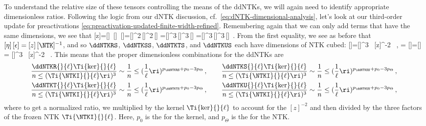 To understand the relative size of these tensors controlling the means of the ddNTKs, we will again need to identify  appropriate dimensionless ratios. Following the  logic from our dNTK discussion, cf.~\eqref{eq:dNTK-dimensional-analysis}, let's look at our third-order update for preactivations \eqref{eq:preactivation-updated-finite-width-refined}. Remembering again that we can only add terms that have the same dimensions, we see that
\be\label{eq:ddNTK-dimensional-analysis}
[z]=[\eta]\, [\epsilon] \,[\NTK]=[\eta]^2\,[\epsilon]^2\,[\dNTK] =[\eta]^3\,[\epsilon]^3\,[\ddNTK] =[\eta]^3\,[\epsilon]^3\,[\ddNTKII] \,.
\ee 
From the first equality, we see as before that $[\eta]\,[\epsilon]=[z]\,[\NTK]^{-1}$, and so $\ddNTKRS$, $\ddNTKSS$, $\ddNTKTS$, and $\ddNTKUS$ each have dimensions of NTK cubed:
\be\label{eq:dimensions-of-ddNTK-stuff}
[\ddNTKRS]\equiv [\ddNTK]=[\NTK]^{3} \, [z]^{-2} \, , \qquad [\ddNTKSS] = [\ddNTKTS]=[\ddNTKUS] \equiv [\ddNTKII]= [\NTK]^{3} \, [z]^{-2} \, .
\ee
This means that the proper dimensionless combinations for the ddNTKs are
\begin{align}\label{eq:scaling-relations-ddNTKs}
\frac{\ddNTKR{}{\ell} \Ti{\ker}{}{\ell}}{n \le( \Ti{\NTKI}{}{\ell} \ri)^3 } \sim \frac{1}{n}\le( \frac{1}{\ell} \ri)^{p_\ddNTKRS +p_0 - 3p_\Theta} \,, \qquad \frac{\ddNTKS{}{\ell}\Ti{\ker}{}{\ell}}{n \le( \Ti{\NTKI}{}{\ell} \ri)^3} \sim \frac{1}{n}\le( \frac{1}{\ell} \ri)^{p_\ddNTKSS+p_0  - 3p_\Theta}\, , \\
\frac{\ddNTKT{}{\ell} \Ti{\ker}{}{\ell}}{n \le( \Ti{\NTKI}{}{\ell} \ri)^3 } \sim \frac{1}{n}\le( \frac{1}{\ell} \ri)^{p_\ddNTKTS +p_0- 3p_\Theta} \,, \qquad \frac{\ddNTKU{}{\ell}\Ti{\ker}{}{\ell}}{n \le( \Ti{\NTKI}{}{\ell} \ri)^3} \sim \frac{1}{n}\le( \frac{1}{\ell} \ri)^{p_\ddNTKUS +p_0 - 3p_\Theta}\, ,\label{eq:scaling-relations-ddNTKs-2}
\end{align}
where to get a normalized ratio, we multiplied by the kernel $\Ti{\ker}{}{\ell}$ to account for the $[z]^{-2}$ and then divided by the three factors of the frozen NTK $\Ti{\NTKI}{}{\ell}$. Here, $p_0$ is the  for the kernel, and $p_\Theta$ is the  for the NTK.

